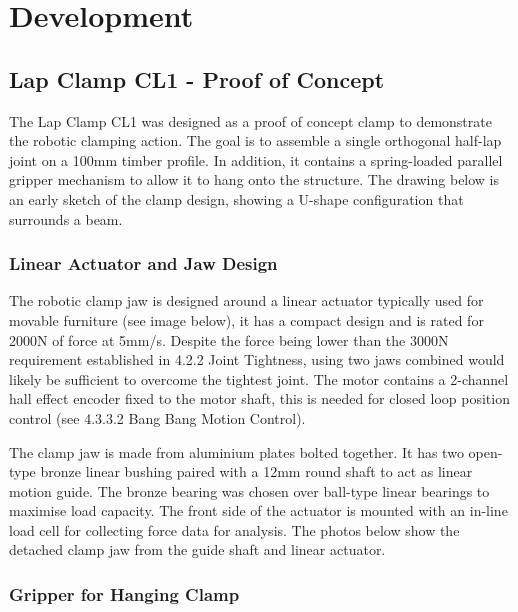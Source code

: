 \section{Development}
\label{section:exploration_1_development}

\subsection{Lap Clamp CL1 - Proof of Concept}
\label{subsection:exploration_1_lap_clamp_cl1_proof_of_concept}

The Lap Clamp CL1 was designed as a proof of concept clamp to demonstrate the robotic clamping action. The goal is to assemble a single orthogonal half-lap joint on a 100mm timber profile. 
In addition, it contains a spring-loaded parallel gripper mechanism to allow it to hang onto the structure. The drawing below is an early sketch of the clamp design, showing a U-shape configuration that surrounds a beam.

\subsubsection{Linear Actuator and Jaw Design}
\label{subsubsection:exploration_1_linear_actuator_and_jaw_design}

The robotic clamp jaw is designed around a linear actuator typically used for movable furniture (see image below), it has a compact design and is rated for 2000N of force at 5mm/s. Despite the force being lower than the 3000N requirement established in 4.2.2 Joint Tightness, using two jaws combined would likely be sufficient to overcome the tightest joint. The motor contains a 2-channel hall effect encoder fixed to the motor shaft, this is needed for closed loop position control (see 4.3.3.2 Bang Bang Motion Control). 


The clamp jaw is made from aluminium plates bolted together. It has two open-type bronze linear bushing paired with a 12mm round shaft to act as linear motion guide. The bronze bearing was chosen over ball-type linear bearings to maximise load capacity. The front side of the actuator is mounted with an in-line load cell for collecting force data for analysis. The photos below show the detached clamp jaw from the guide shaft and linear actuator. 

\subsubsection{Gripper for Hanging Clamp}
\label{subsubsection:exploration_1_gripper_for_hanging_clamp}

